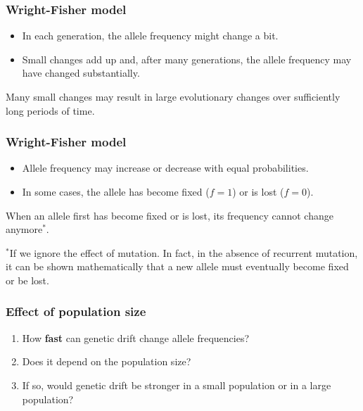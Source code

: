 \documentclass{beamer}
\newcommand{\1}{\ensuremath{\mathbf{1}}}
\begin{document}
\begin{frame}\frametitle{Wright-Fisher model}
	\begin{itemize}
		\item In each generation, the allele frequency might change a bit.
		\item Small changes add up and, after many generations, the allele frequency may have changed substantially.
	\end{itemize}
	\begin{block}{}
		Many small changes may result in large evolutionary changes over sufficiently long periods of time.
	\end{block}
\end{frame}
%
%
%
\begin{frame}\frametitle{Wright-Fisher model}
	\begin{itemize}
		\item Allele frequency may increase or decrease with equal probabilities.
		\item In some cases, the allele has become fixed ($f = 1$) or is lost ($f = 0$).
	\end{itemize}
	\begin{block}{}
		When an allele first has become fixed or is lost, its frequency cannot change anymore$^{*}$.
	\end{block}
	{\scriptsize  $^{*}$If we ignore the effect of mutation. In fact, in the absence of recurrent mutation, it can be shown mathematically that a new allele must eventually become fixed or be lost.}
\end{frame}
%
%
%
\begin{frame}\frametitle{Effect of population size}
	\begin{enumerate}
		\item How \textbf{fast} can genetic drift change allele frequencies?
		\item Does it depend on the population size?
		\item If so, would genetic drift be stronger in a small population or in a large population?
	\end{enumerate}
\end{frame}
\end{document}
